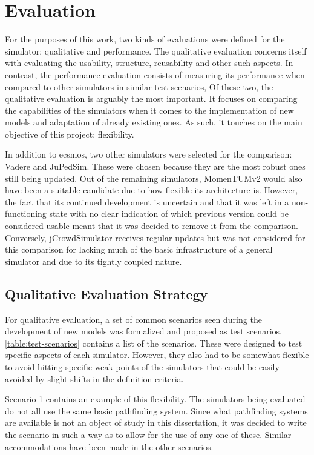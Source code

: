 \documentclass[twoside, 11pt]{article}
\begin{document}
\section{Evaluation} \label{sec:evaluation}

For the purposes of this work, two kinds of evaluations were defined for the simulator: qualitative and performance. The qualitative evaluation concerns itself with evaluating the usability, structure, reusability and other such aspects. In contrast, the performance evaluation consists of measuring its performance when compared to other simulators in similar test scenarios,  Of these two, the qualitative evaluation is arguably the most important. It focuses on comparing the capabilities of the simulators when it comes to the implementation of new models and adaptation of already existing ones. As such, it touches on the main objective of this project: flexibility. 

In addition to \gls{ecsmos}, two other simulators were selected for the comparison: Vadere and JuPedSim. These were chosen because they are the most robust ones still being updated. Out of the remaining simulators, MomenTUMv2 would also have been a suitable candidate due to how flexible its architecture is. However, the fact that its continued development is uncertain and that it was left in a non-functioning state with no clear indication of which previous version could be considered usable meant that it was decided to remove it from the comparison. Conversely, jCrowdSimulator receives regular updates but was not considered for this comparison for lacking much of the basic infrastructure of a general simulator and due to its tightly coupled nature.

\subsection{Qualitative Evaluation Strategy} \label{sec:qualitative-evaluation}

For qualitative evaluation, a set of common scenarios seen during the development of new models was formalized and proposed as test scenarios. \autoref{table:test-scenarios} contains a list of the scenarios. These were designed to test specific aspects of each simulator. However, they also had to be somewhat flexible to avoid hitting specific weak points of the simulators that could be easily avoided by slight shifts in the definition criteria. 

Scenario 1 contains an example of this flexibility. The simulators being evaluated do not all use the same basic pathfinding system. Since what pathfinding systems are available is not an object of study in this dissertation, it was decided to write the scenario in such a way as to allow for the use of any one of these. Similar accommodations have been made in the other scenarios. 
\end{document}
